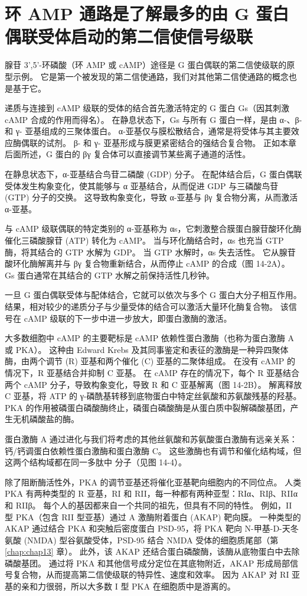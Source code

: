 \section{环 AMP 通路是了解最多的由 G 蛋白偶联受体启动的第二信使信号级联}

腺苷 3',5'-环磷酸（环 AMP 或 cAMP）途径是 G 蛋白偶联的第二信使级联的原型示例。
它是第一个被发现的第二信使通路，我们对其他第二信使通路的概念也是基于它。


递质与连接到 cAMP 级联的受体的结合首先激活特定的 G 蛋白 Gs（因其刺激 cAMP 合成的作用而得名）。 
在静息状态下，Gs 与所有 G 蛋白一样，是由 α-、β- 和 γ- 亚基组成的三聚体蛋白。
α-亚基仅与膜松散结合，通常是将受体与其主要效应酶偶联的试剂。
β- 和 γ- 亚基形成与膜更紧密结合的强结合复合物。 
正如本章后面所述，G 蛋白的 βγ 复合体可以直接调节某些离子通道的活性。


在静息状态下，α-亚基结合鸟苷二磷酸 (GDP) 分子。 
在配体结合后，G 蛋白偶联受体发生构象变化，使其能够与 α 亚基结合，从而促进 GDP 与三磷酸鸟苷 (GTP) 分子的交换。
这导致构象变化，导致 α-亚基与 βγ 复合物分离，从而激活 α-亚基。


与 cAMP 级联偶联的特定类别的 α-亚基称为 αs，它刺激整合膜蛋白腺苷酸环化酶催化三磷酸腺苷 (ATP) 转化为 cAMP。
当与环化酶结合时，αs 也充当 GTP 酶，将其结合的 GTP 水解为 GDP。
当 GTP 水解时，αs 失去活性。 它从腺苷酸环化酶解离并与 βγ 复合物重新结合，从而停止 cAMP 的合成（图 14-2A）。
Gs 蛋白通常在其结合的 GTP 水解之前保持活性几秒钟。


一旦 G 蛋白偶联受体与配体结合，它就可以依次与多个 G 蛋白大分子相互作用。
结果，相对较少的递质分子与少量受体的结合可以激活大量环化酶复合物。
该信号在 cAMP 级联的下一步中进一步放大，即蛋白激酶的激活。


大多数细胞中 cAMP 的主要靶标是 cAMP 依赖性蛋白激酶（也称为蛋白激酶 A 或 PKA）。
这种由 Edward Krebs 及其同事鉴定和表征的激酶是一种异四聚体酶，由两个调节 (R) 亚基和两个催化 (C) 亚基的二聚体组成。
在没有 cAMP 的情况下，R 亚基结合并抑制 C 亚基。 在 cAMP 存在的情况下，每个 R 亚基结合两个 cAMP 分子，导致构象变化，导致 R 和 C 亚基解离（图 14-2B）。
解离释放 C 亚基，将 ATP 的 γ-磷酰基转移到底物蛋白中特定丝氨酸和苏氨酸残基的羟基。
PKA 的作用被磷蛋白磷酸酶终止，磷蛋白磷酸酶是从蛋白质中裂解磷酸基团，产生无机磷酸盐的酶。


蛋白激酶 A 通过进化与我们将考虑的其他丝氨酸和苏氨酸蛋白激酶有远亲关系：钙/钙调蛋白依赖性蛋白激酶和蛋白激酶 C。
这些激酶也有调节和催化结构域，但这两个结构域都在同一多肽中 分子（见图 14-4）。


除了阻断酶活性外，PKA 的调节亚基还将催化亚基靶向细胞内的不同位点。
人类 PKA 有两种类型的 R 亚基，RI 和 RII，每一种都有两种亚型：RIα、RIβ、RIIα 和 RIIβ。
每个人的基因都来自一个共同的祖先，但具有不同的特性。
例如，II 型 PKA（包含 RII 型亚基）通过 A 激酶附着蛋白 (AKAP) 靶向膜。
一种类型的 AKAP 通过结合 PKA 和突触后密度蛋白 PSD-95，将 PKA 靶向 N-甲基-D-天冬氨酸 (NMDA) 型谷氨酸受体，PSD-95 结合 NMDA 受体的细胞质尾部（第 \ref{chap:chap13} 章）。
此外，该 AKAP 还结合蛋白磷酸酶，该酶从底物蛋白中去除磷酸基团。
通过将 PKA 和其他信号成分定位在其底物附近，AKAP 形成局部信号复合物，从而提高第二信使级联的特异性、速度和效率。
因为 AKAP 对 RI 亚基的亲和力很弱，所以大多数 I 型 PKA 在细胞质中是游离的。


